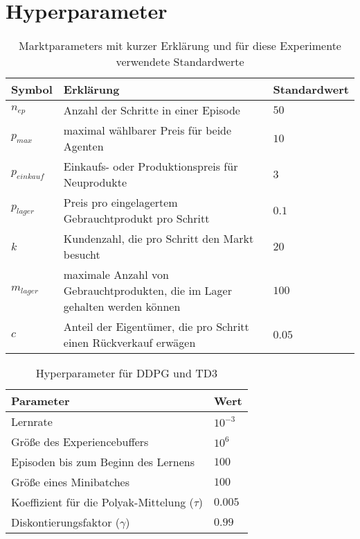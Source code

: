 \section{Hyperparameter}
\begin{table}[t]
    \centering
    \begin{tabular}{l l l}
        \toprule
        Symbol        & Erklärung                                                                   & Standardwert\\\midrule
        $n_{ep}$      & Anzahl der Schritte in einer Episode                                        & $50$\\
        $p_{max}$     & maximal wählbarer Preis für beide Agenten                                   & $10$\\
        $p_{einkauf}$ & Einkaufs- oder Produktionspreis für Neuprodukte                             & $3$\\
        $p_{lager}$   & Preis pro eingelagertem Gebrauchtprodukt pro Schritt                        & $0.1$\\
        $k$           & Kundenzahl, die pro Schritt den Markt besucht                               & $20$\\
        $m_{lager}$   & maximale Anzahl von Gebrauchtprodukten, die im Lager gehalten werden können & $100$\\
        $c$           & Anteil der Eigentümer, die pro Schritt einen Rückverkauf erwägen            & $0.05$\\\bottomrule
    \end{tabular}
    \caption{Marktparameters mit kurzer Erklärung und für diese Experimente verwendete Standardwerte}
    \label{tab:default_parameters}
\end{table}

\begin{table}[t]
    \centering
    \begin{tabular}{p{} l}
        \toprule
        Parameter                                     & Wert\\\midrule
        Lernrate                                      & $10^{-3}$\\
        Größe des Experiencebuffers                   & $10^6$\\
        Episoden bis zum Beginn des Lernens           & $100$\\
        Größe eines Minibatches                       & $100$\\
        Koeffizient für die Polyak-Mittelung ($\tau$) & $0.005$\\
        Diskontierungsfaktor ($\gamma$)               & $0.99$\\\bottomrule
    \end{tabular}
    \caption{Hyperparameter für DDPG und TD3}
    \label{tab:DDPGHyperparameters}
\end{table}

